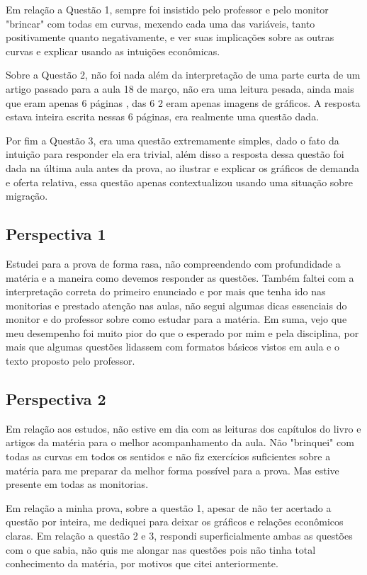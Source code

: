 \documentclass[a4paper,12pt]{article}[abntex2]
\begin{document}
Em relação a Questão 1, sempre foi insistido pelo professor e pelo monitor "brincar" com todas em curvas, mexendo cada uma das variáveis, tanto positivamente quanto negativamente, e ver suas implicações sobre as outras curvas e explicar usando as intuições econômicas.

Sobre a Questão 2, não foi nada além da interpretação de uma parte curta de um artigo passado para a aula 18 de março, não era uma leitura pesada, ainda mais que eram apenas 6 páginas , das 6 2 eram apenas imagens de gráficos. A resposta estava inteira escrita nessas 6 páginas, era realmente uma questão dada.

Por fim a Questão 3, era uma questão extremamente simples, dado o fato da intuição para responder ela era trivial, além disso a resposta dessa questão foi dada na última aula antes da prova, ao ilustrar e explicar os gráficos de demanda e oferta relativa, essa questão apenas contextualizou usando uma situação sobre migração.

\subsection{\textbf{Perspectiva 1}}

Estudei para a prova de forma rasa, não compreendendo com profundidade a matéria e a maneira como devemos responder as questões. Também faltei com a interpretação correta do primeiro enunciado e por mais que tenha ido nas monitorias e prestado atenção nas aulas, não segui algumas dicas essenciais do monitor e do professor sobre como estudar para a matéria.
Em suma, vejo que meu desempenho foi muito pior do que o esperado por mim e pela disciplina, por mais que algumas questões lidassem com formatos básicos vistos em aula e o texto proposto pelo professor.

\subsection{\textbf{Perspectiva 2}}

Em relação aos estudos, não estive em dia com as leituras dos capítulos do livro e artigos da matéria para o melhor acompanhamento da aula. Não "brinquei" com todas as curvas em todos os sentidos e não fiz exercícios suficientes sobre a matéria para me preparar da melhor forma possível para a prova. Mas estive presente em todas as monitorias.

Em relação a minha prova, sobre a questão 1, apesar de não ter acertado a questão por inteira, me dediquei para deixar os gráficos e relações econômicos claras. Em relação a questão 2 e 3, respondi superficialmente ambas as questões com o que sabia, não quis me alongar nas questões pois não tinha total conhecimento da matéria, por motivos que citei anteriormente.
\end{document}
